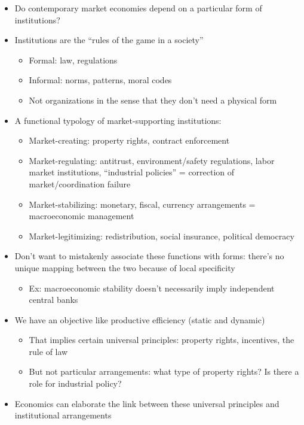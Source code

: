 \begin{itemize}
\tightlist
\item
  Do contemporary market economies depend on a particular form of
  institutions?
\item
  Institutions are the ``rules of the game in a society''

  \begin{itemize}
  \tightlist
  \item
    Formal: law, regulations
  \item
    Informal: norms, patterns, moral codes
  \item
    Not organizations in the sense that they don't need a physical form
  \end{itemize}
\item
  A functional typology of market-supporting institutions:

  \begin{itemize}
  \tightlist
  \item
    Market-creating: property rights, contract enforcement
  \item
    Market-regulating: antitrust, environment/safety regulations, labor
    market institutions, ``industrial policies'' = correction of
    market/coordination failure
  \item
    Market-stabilizing: monetary, fiscal, currency arrangements =
    macroeconomic management
  \item
    Market-legitimizing: redistribution, social insurance, political
    democracy
  \end{itemize}
\item
  Don't want to mistakenly associate these functions with forms: there's
  no unique mapping between the two because of local specificity

  \begin{itemize}
  \tightlist
  \item
    Ex: macroeconomic stability doesn't necessarily imply independent
    central banks
  \end{itemize}
\item
  We have an objective like productive efficiency (static and dynamic)

  \begin{itemize}
  \tightlist
  \item
    That implies certain universal principles: property rights,
    incentives, the rule of law
  \item
    But not particular arrangements: what type of property rights? Is
    there a role for industrial policy?
  \end{itemize}
\item
  Economics can elaborate the link between these universal principles
  and institutional arrangements
\end{itemize}

